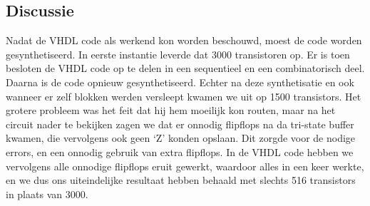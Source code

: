 \documentclass{scrreprt} %
\begin{document}
\subsection{Discussie}
Nadat de VHDL code als werkend kon worden beschouwd, moest de code worden gesynthetiseerd. In eerste instantie leverde dat 3000 transistoren op. Er is toen besloten de VHDL code op te delen in een sequentieel en een combinatorisch deel. Daarna is de code opnieuw gesynthetiseerd.  Echter na deze synthetisatie en ook wanneer er zelf blokken werden versleept kwamen we uit op 1500 transistors. Het grotere probleem was het feit dat hij hem moeilijk kon routen, maar na het circuit nader te bekijken zagen we dat er onnodig flipflops na da tri-state buffer kwamen, die vervolgens ook geen ‘Z’ konden opslaan. Dit zorgde voor de nodige errors, en een onnodig gebruik van extra flipflops. In de VHDL code hebben we vervolgens alle onnodige flipflops eruit gewerkt, waardoor alles in een keer werkte, en we dus ons uiteindelijke resultaat hebben behaald met slechts 516 transistors in plaats van 3000. 
\end{document}
